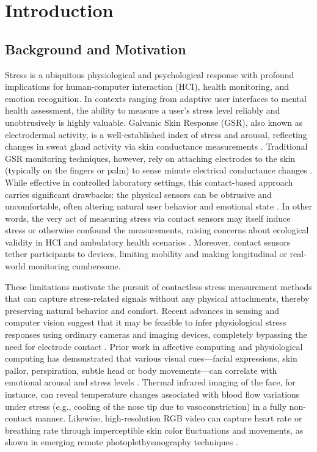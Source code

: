 \chapter{Introduction}
\label{chap:introduction}

\section{Background and Motivation}
\label{sec:intro_background}

Stress is a ubiquitous physiological and psychological response with profound implications for human-computer interaction (HCI), health monitoring, and emotion recognition. In contexts ranging from adaptive user interfaces to mental health assessment, the ability to measure a user's stress level reliably and unobtrusively is highly valuable. Galvanic Skin Response (GSR), also known as electrodermal activity, is a well-established index of stress and arousal, reflecting changes in sweat gland activity via skin conductance measurements \cite{Boucsein2012}. Traditional GSR monitoring techniques, however, rely on attaching electrodes to the skin (typically on the fingers or palm) to sense minute electrical conductance changes \cite{Fowles1981}. While effective in controlled laboratory settings, this contact-based approach carries significant drawbacks: the physical sensors can be obtrusive and uncomfortable, often altering natural user behavior and emotional state \cite{Cacioppo2007}. In other words, the very act of measuring stress via contact sensors may itself induce stress or otherwise confound the measurements, raising concerns about ecological validity in HCI and ambulatory health scenarios \cite{Wilhelm2010}. Moreover, contact sensors tether participants to devices, limiting mobility and making longitudinal or real-world monitoring cumbersome.

These limitations motivate the pursuit of contactless stress measurement methods that can capture stress-related signals without any physical attachments, thereby preserving natural behavior and comfort. Recent advances in sensing and computer vision suggest that it may be feasible to infer physiological stress responses using ordinary cameras and imaging devices, completely bypassing the need for electrode contact \cite{Picard2001}. Prior work in affective computing and physiological computing has demonstrated that various visual cues---facial expressions, skin pallor, perspiration, subtle head or body movements---can correlate with emotional arousal and stress levels \cite{Healey2005}. Thermal infrared imaging of the face, for instance, can reveal temperature changes associated with blood flow variations under stress (e.g., cooling of the nose tip due to vasoconstriction) in a fully non-contact manner. Likewise, high-resolution RGB video can capture heart rate or breathing rate through imperceptible skin color fluctuations and movements, as shown in emerging remote photoplethysmography techniques \cite{Poh2010}.


